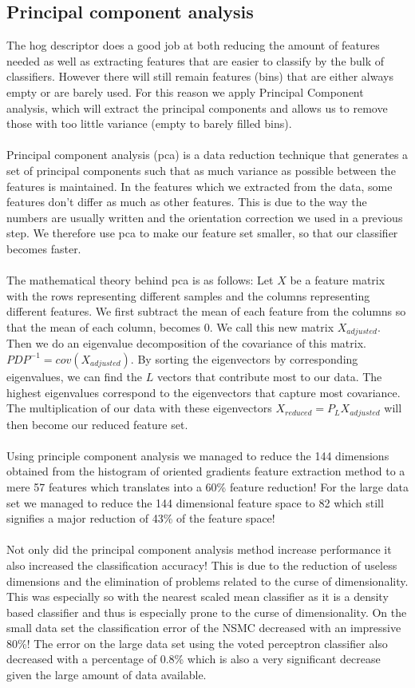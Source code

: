 \documentclass[%
        compressed,
        final,
        notitlepage,
        narroweqnarray,
        inline,
        twoside,
        ]{ieee}
\begin{document}
\subsection{Principal component analysis}
The hog descriptor does a good job at both reducing the amount of features needed as well as extracting features that are easier to classify by the bulk of classifiers. However there will still remain features (bins) that are either always empty or are barely used. For this reason we apply Principal Component analysis, which will extract the principal components and allows us to remove those with too little variance (empty to barely filled bins).\\\\
Principal component analysis (pca) is a data reduction technique that generates a set of
principal components such that as much variance as possible between the features is maintained.  In the features which we extracted from the data, some features don't differ as much as other features. This is due to the way the numbers are usually written and the orientation correction we used in a previous step. We therefore use pca to make our feature set smaller, so that our classifier becomes faster.\\\\
The mathematical theory behind pca is as follows:
Let $X$ be a feature matrix with the rows representing different samples and the
columns representing different features.  We first subtract the mean of each
feature from the columns so that the mean of each column, becomes 0. We call
this new matrix $X_{adjusted}$. Then we do an eigenvalue decomposition of the
covariance of this matrix. $PDP^{-1}=cov(X_{adjusted})$. By sorting the
eigenvectors by corresponding eigenvalues, we can find the $L$ vectors that
contribute most to our data.  The highest eigenvalues correspond to the
eigenvectors that capture most covariance. The multiplication of our data with
these eigenvectors $X_{reduced}=P_L X_{adjusted}$ will then become our reduced feature set.\cite{Pearson}\\\\
Using principle component analysis we managed to reduce the 144 dimensions obtained from the histogram of oriented gradients feature extraction method to a mere 57 features which translates into a 60\% feature reduction! For the large data set we managed to reduce the 144 dimensional feature space to 82 which still signifies a major reduction of 43\% of the feature space! \\\\
Not only did the principal component analysis method increase performance it also increased the classification accuracy! This is due to the reduction of useless dimensions and the elimination of problems related to the curse of dimensionality. This was especially so with the nearest scaled mean classifier as it is a density based classifier and thus is especially prone to the curse of dimensionality. On the small data set the classification error of the NSMC decreased with an impressive 80\%! The error on the large data set using the voted perceptron classifier also decreased with a percentage of 0.8\% which is also a very significant decrease given the large amount of data available.
\end{document}
